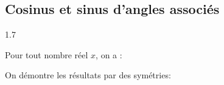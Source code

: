     \subsection{Cosinus et sinus d'angles associés}
    
        \begin{spacing}{1.7}
        	\begin{bprops}
            Pour tout nombre réel $x$, on a :
            \begin{enumProp}
                \item \pointille[15cm]
                \item \pointille[15cm]
                \item \pointille[15cm]
                \item \pointille[15cm]
            \end{enumProp}
        \end{bprops}
    \end{spacing}
        
        \begin{bdemo}
                On démontre les résultats par des symétries:
        \end{bdemo}
        
